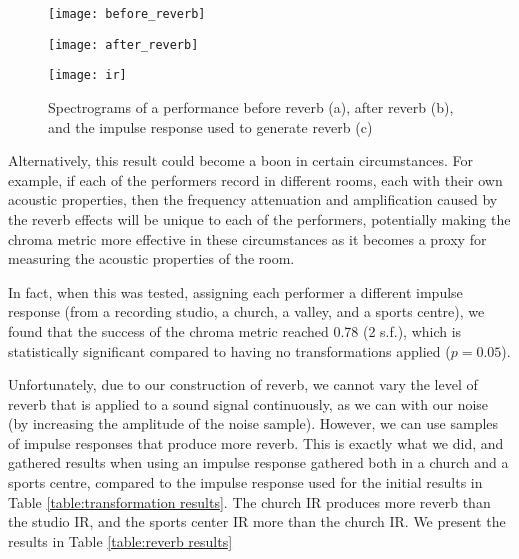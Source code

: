 \documentclass[oneside, class=book, 12pt, crop=false]{standalone}
\begin{document}
\begin{figure}[h]
  \captionsetup{justification=centering}
\begin{minipage}{.33\textwidth}
  \texttt{[image: before\_reverb]}
  \subcaption{}
\end{minipage}%
\begin{minipage}{.33\textwidth}
  \flushleft
  \texttt{[image: after\_reverb]}
  \subcaption{}
\end{minipage}%
\begin{minipage}{.33\textwidth}
  \centering
  \texttt{[image: ir]}
  \subcaption{}
\end{minipage}
\caption{Spectrograms of a performance before reverb (a), after reverb (b), and the impulse response used to generate reverb (c)}
  \label{fig:convolutionspectrograms}
\end{figure}

Alternatively, this result could become a boon in certain circumstances. For example, if each of the performers record in different rooms, each with their own acoustic properties, then the frequency attenuation and amplification caused by the reverb effects will be unique to each of the performers, potentially making the chroma metric more effective in these circumstances as it becomes a proxy for measuring the acoustic properties of the room.

In fact, when this was tested, assigning each performer a different impulse response (from a recording studio, a church, a valley, and a sports centre), we found that the success of the chroma metric reached 0.78 (2 s.f.), which is statistically significant compared to having no transformations applied ($p=0.05$).

Unfortunately, due to our construction of reverb, we cannot vary the level of reverb that is applied to a sound signal continuously, as we can with our noise (by increasing the amplitude of the noise sample). However, we can use samples of impulse responses that produce more reverb. This is exactly what we did, and gathered results when using an impulse response gathered both in a church and a sports centre, compared to the impulse response used for the initial results in Table \ref{table:transformation results}. The church IR produces more reverb than the studio IR, and the sports center IR more than the church IR. We present the results in Table \ref{table:reverb results}
\end{document}
